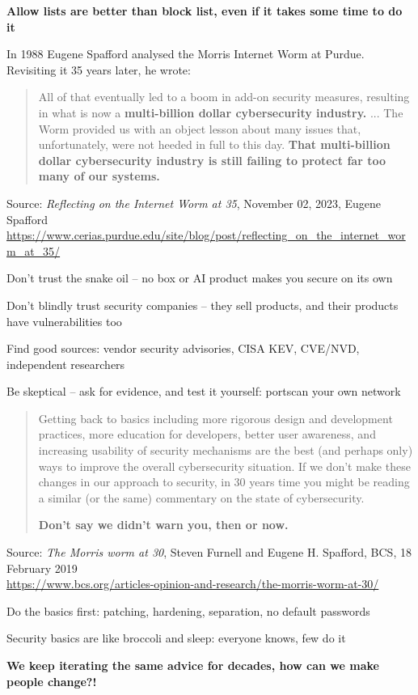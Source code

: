 \documentclass[Screen16to9,17pt]{foils}
\begin{document}
{\bf Allow lists are better than block list, even if it takes some time to do it}



In 1988 Eugene Spafford analysed the Morris Internet Worm at Purdue. Revisiting it 35 years later, he wrote:

\begin{quote}\small
All of that eventually led to a boom in add-on security measures, resulting in what is now a {\bf multi-billion dollar cybersecurity industry.}
...
The Worm provided us with an object lesson about many issues that, unfortunately, were not heeded in full to this day. {\bf That multi-billion dollar cybersecurity industry is still failing to protect far too many of our systems.}
\end{quote}
{\footnotesize Source: \emph{Reflecting on the Internet Worm at 35}, November 02, 2023, Eugene Spafford\\
\url{https://www.cerias.purdue.edu/site/blog/post/reflecting_on_the_internet_worm_at_35/}}

\begin{list2}
\item Don't trust the snake oil -- no box or AI product makes you secure on its own
\item Don't blindly trust security companies -- they sell products, and their products have vulnerabilities too
\item Find good sources: vendor security advisories, CISA KEV, CVE/NVD, independent researchers
\item Be skeptical -- ask for evidence, and test it yourself: portscan your own network
\end{list2}


\begin{quote}\small
Getting back to basics including more rigorous design and development practices, more education for developers, better user awareness, and increasing usability of security mechanisms are the best (and perhaps only) ways to improve the overall cybersecurity situation. If we don’t make these changes in our approach to security, in 30 years time you might be reading a similar (or the same) commentary on the state of cybersecurity.

{\bf Don’t say we didn’t warn you, then or now.}
\end{quote}
{\footnotesize Source: \emph{The Morris worm at 30}, Steven Furnell and Eugene H. Spafford, BCS, 18 February 2019\\
\url{https://www.bcs.org/articles-opinion-and-research/the-morris-worm-at-30/}}

\begin{list2}
\item Do the basics first: patching, hardening, separation, no default passwords
\item Security basics are like broccoli and sleep: everyone knows, few do it
\end{list2}

{\bf We keep iterating the same advice for decades, how can we make people change?!}

\myquestionspage
\end{document}
